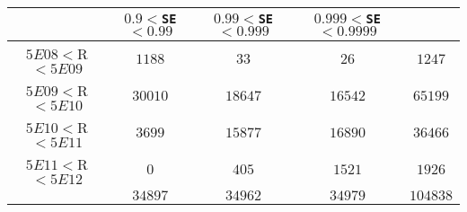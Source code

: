 \begin{center}
\begin{tabular}{|c||c|c|c||c|}
\hline
&$0.9<$\texttt{SE}$<0.99$&$0.99<$\texttt{SE}$<0.999$&$0.999<$\texttt{SE}$<0.9999$&\\
\hline
$5E08<$R$<5E09$&$1188$&$33$&$26$&$1247$\\
\hline
$5E09<$R$<5E10$&$30010$&$18647$&$16542$&$65199$\\
\hline
$5E10<$R$<5E11$&$3699$&$15877$&$16890$&$36466$\\
\hline
$5E11<$R$<5E12$&$0$&$405$&$1521$&$1926$\\
\hline
&$34897$&$34962$&$34979$&$104838$\\
\hline
\end{tabular}
\end{center}
